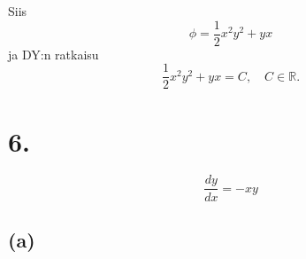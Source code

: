 \documentclass{article}
\begin{document}
Siis
\[
  \phi = \frac{1}{2}x^2y^2 + yx
\]
ja DY:n ratkaisu
\[
  \frac{1}{2}x^2y^2 + yx = C, \quad C \in \mathbb{R}.
\]

\section*{6.}

\[
  \frac{dy}{dx} = -xy
\]

\subsection*{(a)}
\end{document}
